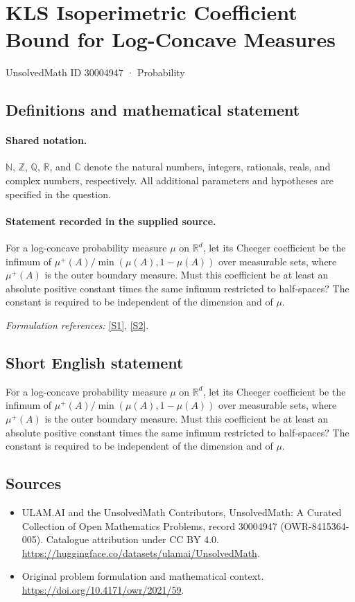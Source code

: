 \documentclass[11pt]{article}
\newcommand{\sref}[2]{\hyperlink{source:#1:#2}{[S#2]}}
\begin{document}
\setcounter{section}{30004946}
\section{KLS Isoperimetric Coefficient Bound for Log-Concave Measures}\label{30004947}
{\small UnsolvedMath ID 30004947 · Probability}
\subsection{Definitions and mathematical statement}

\paragraph{Shared notation.}$\mathbb N$, $\mathbb Z$, $\mathbb Q$, $\mathbb R$, and $\mathbb C$ denote the natural numbers, integers, rationals, reals, and complex numbers, respectively. All additional parameters and hypotheses are specified in the question.


\paragraph{Statement recorded in the supplied source.}
For a log-concave probability measure $\mu$ on $\mathbb R^d$, let its Cheeger coefficient be the infimum of $\mu^+(A)/\min(\mu(A),1-\mu(A))$ over measurable sets, where $\mu^+(A)$ is the outer boundary measure. Must this coefficient be at least an absolute positive constant times the same infimum restricted to half-spaces? The constant is required to be independent of the dimension and of $\mu$.
\par\smallskip\textit{Formulation references:} \sref{30004947}{1}, \sref{30004947}{2}.
\subsection{Short English statement}
For a log-concave probability measure $\mu$ on $\mathbb R^d$, let its Cheeger coefficient be the infimum of $\mu^+(A)/\min(\mu(A),1-\mu(A))$ over measurable sets, where $\mu^+(A)$ is the outer boundary measure. Must this coefficient be at least an absolute positive constant times the same infimum restricted to half-spaces? The constant is required to be independent of the dimension and of $\mu$.
\subsection{Sources}
\begin{itemize}
\item[\hypertarget{source:30004947:1}{S1}] ULAM.AI and the UnsolvedMath Contributors, UnsolvedMath: A Curated Collection of Open Mathematics Problems, record 30004947 (OWR-8415364-005). Catalogue attribution under CC BY 4.0.
\url{https://huggingface.co/datasets/ulamai/UnsolvedMath}.
\item[\hypertarget{source:30004947:2}{S2}] Original problem formulation and mathematical context.
\url{https://doi.org/10.4171/owr/2021/59}.
\end{itemize}
\label{end:30004947}
\end{document}

